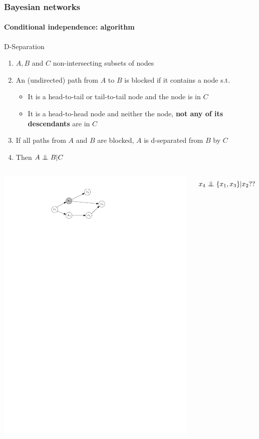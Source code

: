 \documentclass[slidestop,compress,mathserif]{beamer}
\newcommand{\indep}{\ensuremath{\perp\mkern -10mu \perp}}
\begin{document}
\begin{frame}
	\frametitle{Bayesian networks}
	\framesubtitle{Conditional independence: algorithm}
    \vspace{-.5cm}
    \begin{block}{D-Separation}
    \begin{enumerate}
    \item $A,B$ and $C$ non-intersecting subsets of nodes
    \item An (undirected) path from $A$ to $B$ is blocked if it contains
    a node s.t.
    \begin{itemize}
    \item It is a head-to-tail or tail-to-tail node and
    the node is in $C$
    \item It is a head-to-head node and neither the node,
    \textbf{not any of its descendants} are in $C$
    \end{itemize}
    \item If all paths from $A$ and $B$ are blocked,
    $A$ is d-separated from $B$ by $C$
    \item Then $A \indep B | C$
    \end{enumerate}
    \end{block}
      \begin{columns}
    \column[c]{6cm}
    \begin{center}
    \includegraphics[width=.7\textwidth]{dsep1}
    \end{center}
    \column[c]{6cm}
    $$x_4\indep \{x_1,x_3\} | x_2 ??$$
    \end{columns}
   
\end{frame}
\end{document}
